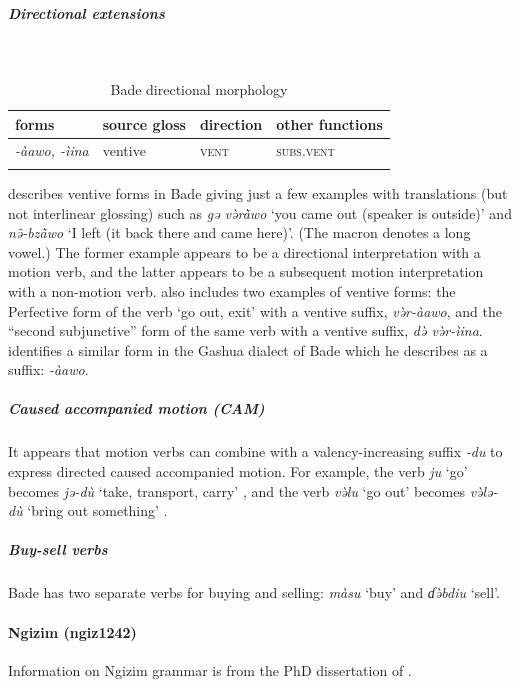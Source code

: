 \subparagraph{Directional extensions}~



\begin{table}[H]
	\caption{Bade directional morphology}
	\label{tab:bade}
	\begin{tabular}{llll} %
		\lsptoprule
		forms & source gloss & direction  & other functions \\ %
		\midrule
		\textit{-àawo, -ìina}  &  ventive  &   \textsc{vent} &   \textsc{subs.vent}  \\
		\lspbottomrule
	\end{tabular}
\end{table} 

\citet[620–621]{schuhBadeMorphology2007} describes ventive forms in Bade giving just a few examples with translations (but not interlinear glossing) such as \textit{gə və̀rā̀wo} `you came out (speaker is outside)' and \textit{nə̂-bzā̀wo} `I left (it back there and came here)'. (The macron denotes a long vowel.) The former example appears to be a directional interpretation with a motion verb, and the latter appears to be a subsequent motion interpretation with a non-motion verb. \citet[307]{schuhChadicCornucopia2017} also includes two examples of ventive forms: the Perfective form of the verb `go out, exit' with a ventive suffix, \textit{və̀r-àawo}, and the ``second subjunctive'' form of the same verb with a ventive suffix, \textit{də̀ və̀r-ìina}. \citet[14]{ziegelmeyerVerbalSystemGashua2014} identifies a similar form in the Gashua dialect of Bade which he describes as a suffix: \textit{-àawo}. 

\subparagraph{Caused accompanied motion (CAM)}



It appears that motion verbs can combine with a valency-increasing suffix \textit{-du} to express directed caused accompanied motion. For example, the verb \textit{ju} `go' becomes \textit{jə-dù} `take, transport, carry' \citep[618]{schuhBadeMorphology2007}, and the verb \textit{vǝ̀lu} `go out' becomes \textit{vǝ̀lǝ-dù} `bring out something' \citep[13]{ziegelmeyerVerbalSystemGashua2014}.

\subparagraph{Buy-sell verbs}



Bade has two separate verbs for buying and selling: \textit{màsu} `buy' and \textit{ɗə̀bdiu} `sell'. 

\paragraph*{Ngizim (ngiz1242)} \label{ngiz} Information on Ngizim grammar is from the PhD dissertation of \citet{schuhAspectsNgizimSyntax1972}.

